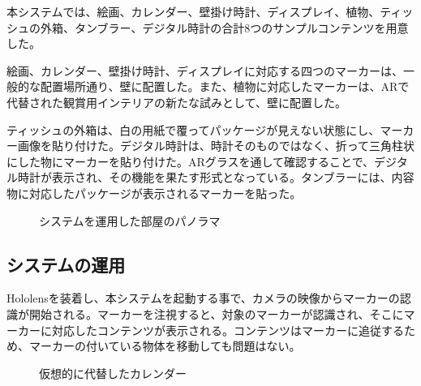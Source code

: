 本システムでは、絵画、カレンダー、壁掛け時計、ディスプレイ、植物、ティッシュの外箱、タンブラー、デジタル時計の合計8つのサンプルコンテンツを用意した。

絵画、カレンダー、壁掛け時計、ディスプレイに対応する四つのマーカーは、一般的な配置場所通り、壁に配置した。また、植物に対応したマーカーは、ARで代替された観賞用インテリアの新たな試みとして、壁に配置した。

ティッシュの外箱は、白の用紙で覆ってパッケージが見えない状態にし、マーカー画像を貼り付けた。デジタル時計は、時計そのものではなく、折って三角柱状にした物にマーカーを貼り付けた。ARグラスを通して確認することで、デジタル時計が表示され、その機能を果たす形式となっている。タンブラーには、内容物に対応したパッケージが表示されるマーカーを貼った。

\begin{figure}[htbp]
  \begin{center}
  \end{center}
  \caption{システムを運用した部屋のパノラマ}
  \label{fig:room-panorama}
\end{figure}

\subsection{システムの運用}

Hololensを装着し、本システムを起動する事で、カメラの映像からマーカーの認識が開始される。マーカーを注視すると、対象のマーカーが認識され、そこにマーカーに対応したコンテンツが表示される。コンテンツはマーカーに追従するため、マーカーの付いている物体を移動しても問題はない。

\begin{figure}[htbp]
  \begin{center}
  \end{center}
  \caption{仮想的に代替したカレンダー}
\end{figure}

